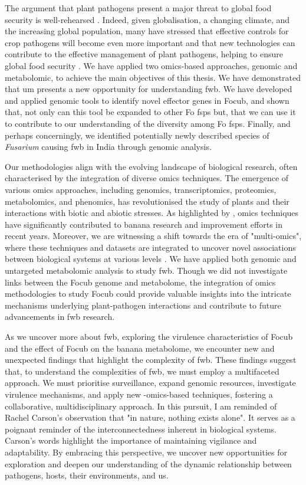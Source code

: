 The argument that plant pathogens present a major threat to global food security is well-rehearsed \parencite{Bebber2014, Fones2020, Nelson2020, Ristaino2021}. Indeed, given globalisation, a changing climate, and the increasing global population, many have stressed that effective controls for crop pathogens will become even more important and that new technologies can contribute to the effective management of plant pathogens, helping to ensure global food security \parencite{Jeger2021, Rizzo2021, Bebber2023, Singh2023}. We have applied two omics-based approaches, genomic and metabolomic, to achieve the main objectives of this thesis. We have demonstrated that \acl{um} presents a new opportunity for understanding \ac{fwb}. We have developed and applied genomic tools to identify novel effector genes in \ac{Focub}, and shown that, not only can this tool be expanded to other \ac{Fo} \acp{fsp} but, that we can use it to contribute to our understanding of the diversity among \ac{Fo} \acp{fsp}. Finally, and perhaps concerningly, we identified potentially newly described species of \textit{Fusarium} causing \ac{fwb} in India through genomic analysis. 

Our methodologies align with the evolving landscape of biological research, often characterised by the integration of diverse omics techniques. The emergence of various omics approaches, including genomics, transcriptomics, proteomics, metabolomics, and phenomics, has revolutionised the study of plants and their interactions with biotic and abiotic stresses. As highlighted by \textcite{Backiyarani2022}, omics techniques have significantly contributed to banana research and improvement efforts in recent years. Moreover, we are witnessing a shift towards the era of "multi-omics", where these techniques and datasets are integrated to uncover novel associations between biological systems at various levels \parencite{Hasin2017}. We have applied both genomic and untargeted metabolomic analysis to study \ac{fwb}. Though we did not investigate links between the \ac{Focub} genome and metabolome, the integration of omics methodologies to study \ac{Focub} could provide valuable insights into the intricate mechanisms underlying plant-pathogen interactions and contribute to future advancements in \ac{fwb} research. 

As we uncover more about \ac{fwb}, exploring the virulence characteristics of \ac{Focub} and the effect of \ac{Focub} on the banana metabolome, we encounter new and unexpected findings that highlight the complexity of \ac{fwb}. These findings suggest that, to understand the complexities of \ac{fwb}, we must employ a multifaceted approach. We must prioritise surveillance, expand genomic resources, investigate virulence mechanisms, and apply new -omics-based techniques, fostering a collaborative, multidisciplinary approach. In this pursuit, I am reminded of Rachel Carson's observation that "in nature, nothing exists alone". It serves as a poignant reminder of the interconnectedness inherent in biological systems. Carson's words highlight the importance of maintaining vigilance and adaptability. By embracing this perspective, we uncover new opportunities for exploration and deepen our understanding of the dynamic relationship between pathogens, hosts, their environments, and us.


